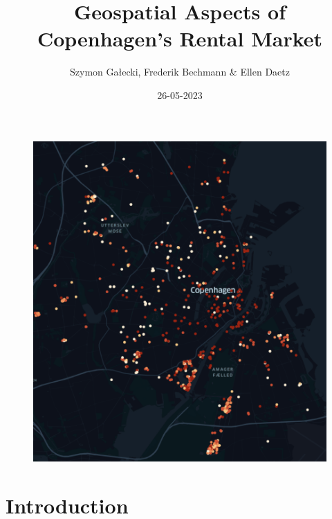 \documentclass{article}
\title{Geospatial Aspects of Copenhagen's Rental Market}
\author{Szymon Gałecki, Frederik Bechmann \& Ellen Daetz}
\date{26-05-2023}
\begin{document}
\maketitle

\begin{figure}[!htbp]
    \centering
    \includegraphics[scale=0.5]{images/front_page.png}
\end{figure}

\newpage

\section{Introduction}


\end{document}
